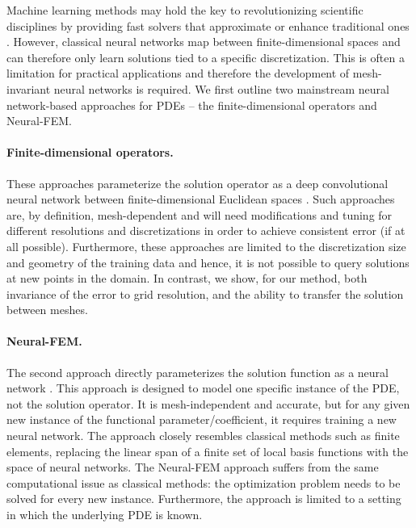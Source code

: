 \documentclass{article} %
\begin{document}
Machine learning methods may hold the key to revolutionizing scientific disciplines by providing fast solvers that approximate or enhance traditional ones \citep{raissi2019physics, jiang2020meshfreeflownet, greenfeld2019learning, kochkov2021machine}. However, classical neural networks map between finite-dimensional spaces and can therefore only learn solutions tied to a specific discretization. This is often a limitation for practical applications and therefore the development of mesh-invariant neural networks is required. 
We first outline two mainstream neural network-based approaches for PDEs -- the finite-dimensional operators and Neural-FEM.

\paragraph{Finite-dimensional operators.}
These approaches parameterize the solution operator as a deep convolutional neural network between finite-dimensional Euclidean spaces \cite{guo2016convolutional, Zabaras, Adler2017, bhatnagar2019prediction,khoo2017solving}.
Such approaches are, by definition, mesh-dependent and will need modifications and tuning for different resolutions and discretizations in order to achieve consistent error (if at all possible). Furthermore, these approaches are limited to the discretization size and geometry of the training data and hence, it is not possible to query solutions at new points in the domain. In contrast, we show, for our method, both invariance of the error to grid resolution, and the ability to transfer the solution between meshes.


\paragraph{Neural-FEM.}
The second approach directly parameterizes the solution function as a neural network 
\citep{Weinan, raissi2019physics,bar2019unsupervised,smith2020eikonet, pan2020physics}. This approach is designed to model one specific instance of the PDE, not the solution operator. It is mesh-independent and accurate, but for any given new instance of the functional parameter/coefficient, it requires training a new neural network. The approach closely resembles classical methods such as finite elements, replacing the linear span of a finite set of local basis functions with the space of neural networks.
The Neural-FEM approach suffers from the same computational issue as classical methods: the optimization problem needs to be solved for every new instance. 
Furthermore, the approach is limited to a setting in which the underlying PDE is known. 
\end{document}
